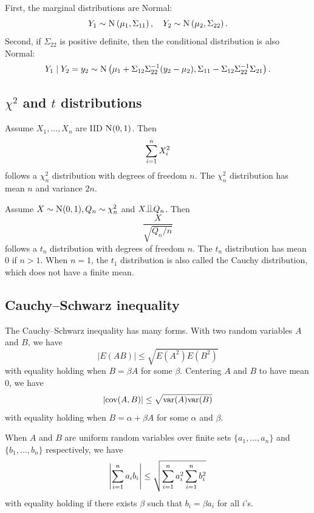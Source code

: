First, the marginal distributions are Normal:
$$
Y_{1}  \sim\textsc{N}\left(\mu_{1},\Sigma_{11}\right),\quad 
Y_{2}  \sim\textsc{N}\left(\mu_{2},\Sigma_{22}\right).
$$
Second, if $\Sigma_{22}$ is positive definite, then the conditional distribution is also Normal:
\[
Y_{1}\mid Y_{2}=y_{2}\sim\textsc{N}\left(\mu_{1}+\Sigma_{12}\Sigma_{22}^{-1}(y_{2}-\mu_{2}),\Sigma_{11}-\Sigma_{12}\Sigma_{22}^{-1}\Sigma_{21}\right).
\]
 

 
 
 \subsection{$\chi^2$ and $t$ distributions}
\label{subsection::chi2-t-distribution}



Assume $X_1,\ldots, X_n$ are IID $\N01$. Then 
$$
\sum_{i=1}^n X_i^2 
$$
follows a $\chi^2_n$ distribution with degrees of freedom $n$. The $\chi^2_n$ distribution has mean $n$ and variance $2n$. 



Assume $X\sim \N01, Q_n\sim \chi^2_n$ and $X\ind Q_n$. Then
$$
\frac{X}{  \sqrt{Q_n / n} }
$$
follows a $t_n$ distribution with degrees of freedom $n$. The $t_n$ distribution has mean 0 if $n>1$. When $n=1$, the $t_1$ distribution is also called the Cauchy distribution, which does not have a finite mean. 







\subsection{Cauchy--Schwarz inequality}\label{sec::cauchy-schwarz-inequality}

 
The  Cauchy--Schwarz inequality has many forms. With two random variables $A$ and $B$, we have
$$
 | E(AB)  | \leq \sqrt{   E(A^2) E(B^2)  }
$$
with equality holding when $B = \beta A$ for some $\beta$. Centering  $A$ and $B$ to have mean 0, we have
$$
| \textup{cov}(A, B)  | \leq \sqrt{   \textup{var}(A) \textup{var}(B)  } 
$$
with equality holding when $B = \alpha + \beta A$ for some $\alpha$ and  $\beta$.

When $A$ and $B$ are uniform random variables over finite sets $\{ a_1, \ldots, a_n \}$ and $\{ b_1, \ldots, b_n \}$ respectively, we have
$$
 \left|  \sum_{i=1}^n a_i b_i  \right| \leq \sqrt{  \sum_{i=1}^n a_i^2   \sum_{i=1}^n b_i^2  }
$$
with equality holding if there exists   $\beta$ such that $b_i =  \beta a_i$ for all $i$'s. 
 
